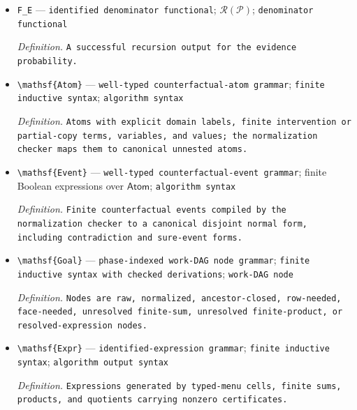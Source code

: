 \documentclass{article}
\begin{document}
\begin{itemize}
  \par\smallskip\noindent\emph{Definition.} \texttt{A successful recursion output for the target numerator.}
  \item \texttt{F\_\allowbreak{}E} --- \texttt{identified denominator functional}; \(\mathscr R(\mathcal P)\); \texttt{denominator functional}
  \par\smallskip\noindent\emph{Definition.} \texttt{A successful recursion output for the evidence probability.}
  \item \texttt{\textbackslash{}\allowbreak{}mathsf\{Atom\}\allowbreak{}} --- \texttt{well-\allowbreak{}typed counterfactual-\allowbreak{}atom grammar}; \texttt{finite inductive syntax}; \texttt{algorithm syntax}
  \par\smallskip\noindent\emph{Definition.} \texttt{Atoms with explicit domain labels,\allowbreak{} finite intervention or partial-\allowbreak{}copy terms,\allowbreak{} variables,\allowbreak{} and values;\allowbreak{} the normalization checker maps them to canonical unnested atoms.}
  \item \texttt{\textbackslash{}\allowbreak{}mathsf\{Event\}\allowbreak{}} --- \texttt{well-\allowbreak{}typed counterfactual-\allowbreak{}event grammar}; finite Boolean expressions over \(\mathsf{Atom}\); \texttt{algorithm syntax}
  \par\smallskip\noindent\emph{Definition.} \texttt{Finite counterfactual events compiled by the normalization checker to a canonical disjoint normal form,\allowbreak{} including contradiction and sure-\allowbreak{}event forms.}
  \item \texttt{\textbackslash{}\allowbreak{}mathsf\{Goal\}\allowbreak{}} --- \texttt{phase-\allowbreak{}indexed work-\allowbreak{}DAG node grammar}; \texttt{finite inductive syntax with checked derivations}; \texttt{work-\allowbreak{}DAG node}
  \par\smallskip\noindent\emph{Definition.} \texttt{Nodes are raw,\allowbreak{} normalized,\allowbreak{} ancestor-\allowbreak{}closed,\allowbreak{} row-\allowbreak{}needed,\allowbreak{} face-\allowbreak{}needed,\allowbreak{} unresolved finite-\allowbreak{}sum,\allowbreak{} unresolved finite-\allowbreak{}product,\allowbreak{} or resolved-\allowbreak{}expression nodes.}
  \item \texttt{\textbackslash{}\allowbreak{}mathsf\{Expr\}\allowbreak{}} --- \texttt{identified-\allowbreak{}expression grammar}; \texttt{finite inductive syntax}; \texttt{algorithm output syntax}
  \par\smallskip\noindent\emph{Definition.} \texttt{Expressions generated by typed-\allowbreak{}menu cells,\allowbreak{} finite sums,\allowbreak{} products,\allowbreak{} and quotients carrying nonzero certificates.}

\end{itemize}
\end{document}

